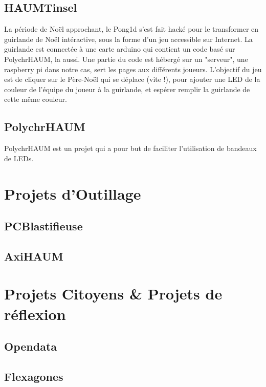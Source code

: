 \subsection{HAUMTinsel}
La période de Noël approchant, le Pong1d s'est fait hacké pour le transformer en guirlande de Noël intéractive, sous la forme d'un jeu accessible sur Internet. La guirlande est connectée à une carte arduino qui contient un code basé sur PolychrHAUM, la aussi. Une partie du code est hébergé sur un "serveur", une raspberry pi dans notre cas, sert les pages aux différents joueurs. L'objectif du jeu est de cliquer sur le Père-Noël qui se déplace (vite !), pour ajouter une LED de la couleur de l'équipe du joueur à la guirlande, et espérer remplir la guirlande de cette même couleur.

\subsection{PolychrHAUM}
PolychrHAUM est un projet qui a pour but de faciliter l'utilisation de bandeaux de LEDs.

\section{Projets d'Outillage}

\subsection{PCBlastifieuse}


\subsection{AxiHAUM}

\section{Projets Citoyens \& Projets de réflexion}

\subsection{Opendata}

\subsection{Flexagones}
